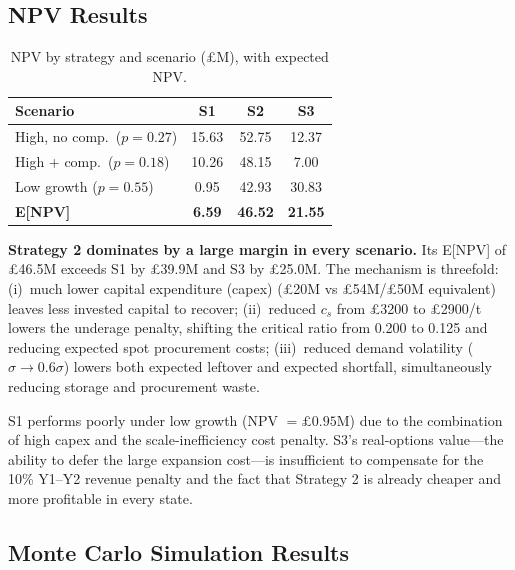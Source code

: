 \documentclass[10pt,a4paper]{article}
\begin{document}
\subsection{NPV Results}

\begin{table}[H]
    \centering
    \caption{NPV by strategy and scenario (£M), with expected NPV.}
    \label{tab:npv}
    \small
    \begin{tabular}{@{}lccc@{}}
        \toprule
        \textbf{Scenario}            & \textbf{S1}   & \textbf{S2}    & \textbf{S3}    \\
        \midrule
        High, no comp.\ ($p = 0.27$) & 15.63         & 52.75          & 12.37          \\
        High + comp.\  ($p = 0.18$)  & 10.26         & 48.15          & 7.00           \\
        Low growth     ($p = 0.55$)  & 0.95          & 42.93          & 30.83          \\
        \midrule
        \textbf{E[NPV]}              & \textbf{6.59} & \textbf{46.52} & \textbf{21.55} \\
        \bottomrule
    \end{tabular}
\end{table}

\textbf{Strategy 2 dominates by a large margin in every scenario.} Its E[NPV] of \pounds46.5M exceeds S1 by \pounds39.9M and S3 by \pounds25.0M. The mechanism is threefold: (i)~much lower capital expenditure (capex) (\pounds20M vs \pounds54M/\pounds50M equivalent) leaves less invested capital to recover; (ii)~reduced $c_s$ from \pounds3200 to \pounds2900/t lowers the underage penalty, shifting the critical ratio from 0.200 to 0.125 and reducing expected spot procurement costs; (iii)~reduced demand volatility ($\sigma \to 0.6\sigma$) lowers both expected leftover and expected shortfall, simultaneously reducing storage and procurement waste.

S1 performs poorly under low growth (NPV $= \pounds0.95$M) due to the combination of high capex and the scale-inefficiency cost penalty. S3's real-options value---the ability to defer the large expansion cost---is insufficient to compensate for the 10\% Y1--Y2 revenue penalty and the fact that Strategy 2 is already cheaper and more profitable in every state.

\subsection{Monte Carlo Simulation Results}
\end{document}
